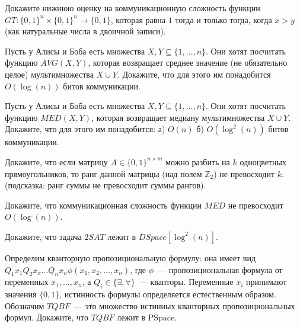 \setcounter{curtask}{55}


\begin{task}
    Докажите нижнюю оценку на коммуникационную сложность функции $GT: \{0, 1\}^n
    \times \{0, 1\}^n \rightarrow \{0, 1\}$, которая равна $1$ тогда и только тогда,
    когда $x > y$ (как натуральные числа в двоичной записи).
\end{task}

\begin{task}
    Пусть у Алисы и Боба есть множества $X, Y \subseteq \{1, \dots, n\}$. Они хотят
    посчитать функцию $AVG(X, Y)$, которая возвращает среднее значение (не
    обязательно целое) мультимножества $X \cup Y$. Докажите, что для этого им
    понадобится $O(\log(n))$ битов коммуникации.
\end{task}

\begin{task}
    Пусть у Алисы и Боба есть множества $X, Y \subseteq \{1, \dots, n\}$. Они хотят
    посчитать функцию $MED(X, Y)$, которая возвращает медиану мультимножества $X \cup
    Y$. Докажите, что для этого им понадобится:
    а) $O(n)$ б) $O(\log^2(n))$ битов коммуникации.
\end{task}

\begin{task}
    Докажите, что если матрицу $A \in \{0, 1\}^{n \times m}$ можно разбить на $k$
    одноцветных прямоугольников, то ранг данной матрицы (над полем $\mathbb{Z}_2$) не
    превосходит $k$. (подсказка: ранг суммы не превосходит суммы рангов).
\end{task}

\begin{task}
    Докажите, что коммуникационная сложность функции $MED$ не превосходит $O(\log(n))$.
\end{task}


\breakline

\begin{ptask}{41}
	Докажите, что задача $2SAT$ лежит в $DSpace[\log^2(n)]$.    
\end{ptask}

\begin{ptask}{42}
	Определим кванторную пропозициональную формулу: она имеет вид \\
    $Q_1 x_1 Q_2 x_x \dots Q_n x_n \phi(x_1, x_2, \dots, x_n)$, где $\phi$~---
    пропозициональная формула от переменных $x_1, \dots, x_n$, а $Q_i \in \{\exists,
    \forall\}$~--- кванторы. Переменные $x_i$ принимают значения $\{0, 1\}$,
    истинность формулы определяется естественным образом. Обозначим $TQBF$~--- это
    множество истинных кванторных пропозициональных формул. Докажите, что $TQBF$
    лежит в $\mathrm{PSpace}$.
\end{ptask}

